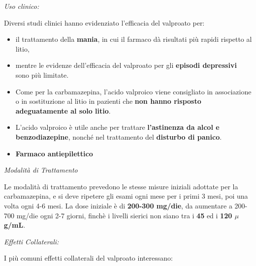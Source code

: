 \begin{itemize}
\emph{\emph{Uso clinico:}}

Diversi studi clinici hanno evidenziato l'efficacia del valproato per:

\begin{itemize}
\item
  il trattamento della \textbf{mania}, in cui il farmaco dà risultati
  più rapidi rispetto al litio,
\item
  mentre le evidenze dell'efficacia del valproato per gli
  \textbf{episodi depressivi} sono più limitate.
\item
  Come per la carbamazepina, l'acido valproico viene consigliato in
  associazione o in sostituzione al litio in pazienti che \textbf{non
  hanno risposto adeguatamente al solo litio}.
\item
  L'acido valproico è utile anche per trattare \textbf{l'astinenza da
  alcol e benzodiazepine}, nonché nel trattamento del \textbf{disturbo
  di panico}.
\item
  \textbf{Farmaco antiepilettico}
\end{itemize}

\emph{\emph{Modalità di Trattamento}}

Le modalità di trattamento prevedono le stesse misure iniziali adottate
per la carbamazepina, e si deve ripetere gli esami ogni mese per i primi
3 mesi, poi una volta ogni 4-6 mesi. La dose iniziale è di
\textbf{200-300 mg/die}, da aumentare a 200-700 mg/die ogni 2-7 giorni,
finchè i livelli sierici non siano tra i \textbf{45} ed i \textbf{120
$\mu$g/mL}.

\emph{\emph{Effetti Collaterali:}}

I più comuni effetti collaterali del valproato interessano:


\end{itemize}
